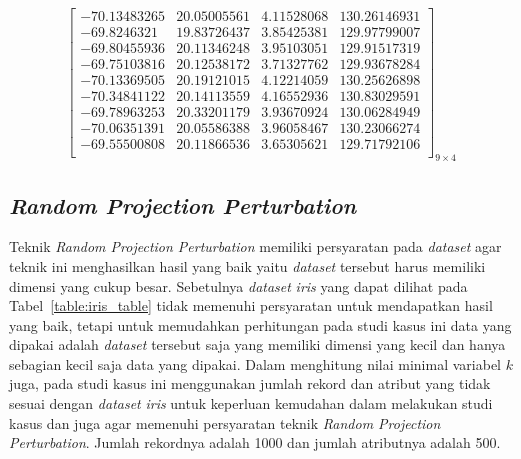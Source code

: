 \begin{enumerate}
    \[
        \begin{bmatrix}
        -70.13483265  &  20.05005561  &   4.11528068  & 130.26146931 \\
        -69.8246321   &  19.83726437  &   3.85425381 &  129.97799007 \\
        -69.80455936  &  20.11346248  &   3.95103051 &  129.91517319 \\
        -69.75103816  &  20.12538172  &   3.71327762 &  129.93678284 \\
        -70.13369505  &  20.19121015  &   4.12214059 &  130.25626898 \\
        -70.34841122  &  20.14113559  &   4.16552936  & 130.83029591 \\
        -69.78963253 &   20.33201179  &   3.93670924 &  130.06284949 \\
        -70.06351391 &   20.05586388   &  3.96058467 &  130.23066274 \\
        -69.55500808  &  20.11866536  &   3.65305621  & 129.71792106 \\
        \end{bmatrix}_{9\times 4}
    \]
\end{enumerate} 

\subsection{\textit{Random Projection Perturbation}}
\label{subsec:studi-rpp}

Teknik \textit{Random Projection Perturbation} memiliki persyaratan pada \textit{dataset} agar teknik ini menghasilkan hasil yang baik yaitu \textit{dataset} tersebut harus memiliki dimensi yang cukup besar. Sebetulnya \textit{dataset} \textit{iris} yang dapat dilihat pada Tabel~\ref{table:iris_table} tidak memenuhi persyaratan untuk mendapatkan hasil yang baik, tetapi untuk memudahkan perhitungan pada studi kasus ini data yang dipakai adalah \textit{dataset} tersebut saja yang memiliki dimensi yang kecil dan hanya sebagian kecil saja data yang dipakai. Dalam menghitung nilai minimal variabel \(k\) juga, pada studi kasus ini menggunakan jumlah rekord dan atribut yang tidak sesuai dengan \textit{dataset} \textit{iris} untuk keperluan kemudahan dalam melakukan studi kasus dan juga agar memenuhi persyaratan teknik \textit{Random Projection Perturbation}. Jumlah rekordnya adalah 1000 dan jumlah atributnya adalah 500.

